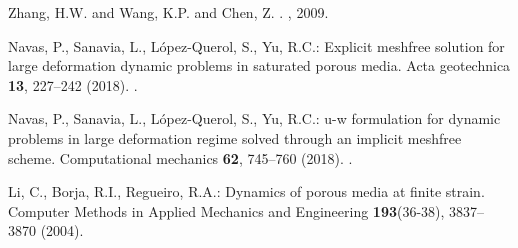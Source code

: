 \documentclass[12pt]{article}
\begin{document}

\begin{thebibliography}{10}

Zhang, H.W. and Wang, K.P.  and Chen, Z.
.
, 2009.

Navas, P., Sanavia, L., L{\'{o}}pez-Querol, S., Yu, R.C.: {Explicit meshfree
  solution for large deformation dynamic problems in saturated porous media.}
\newblock Acta geotechnica \textbf{13}, 227--242 (2018).
\newblock {}.

Navas, P., Sanavia, L., L{\'{o}}pez-Querol, S., Yu, R.C.: u-w formulation for
  dynamic problems in large deformation regime solved through an implicit
  meshfree scheme.
\newblock Computational mechanics \textbf{62}, 745--760 (2018).
\newblock {}.

Li, C., Borja, R.I., Regueiro, R.A.: {Dynamics of porous media at finite
  strain}.
\newblock Computer Methods in Applied Mechanics and Engineering
  \textbf{193}(36-38), 3837--3870 (2004).
\newblock {}



\end{thebibliography}
\end{document}
